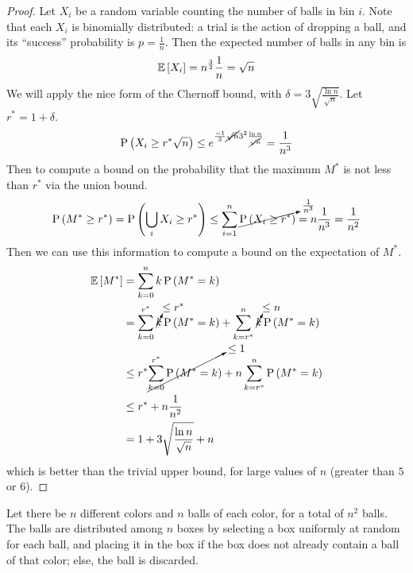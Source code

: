 \documentclass[11pt]{article}
\begin{document}
\begin{proof}
    Let $X_i$ be a random variable counting the number of balls in bin $i$.
    Note that each $X_i$ is binomially distributed:
    a trial is the action of dropping a ball, and its ``success'' probability
    is $p = \frac{1}{n}$.
    Then the expected number of balls in any bin is
    \begin{equation*}
        \E{X_i} = n^{\frac{3}{2}} \frac{1}{n} = \sqrt{n}
    \end{equation*}
    We will apply the nice form of the Chernoff bound, with
    $\delta = 3 \sqrt{\frac{\ln n}{\sqrt n}}$.
    Let $r^* = 1 + \delta$.
    \begin{equation*}
        \P{X_i \geq r^* \sqrt{n}}
        \leq e^{
            \frac{-1}{3} \cancel{\sqrt{n}} 3^2 \frac{\ln n}{\cancel{\sqrt n}}
        }
        = \frac{1}{n^3}
    \end{equation*}
    Then to compute a bound on the probability that the maximum $M^*$ is not
    less than $r^*$ via the union bound.
    \begin{equation*}
        \P{M^* \geq r^*}
        = \P{\Union_i X_i \geq r^*}
        \leq \sum_{i=1}^n \cancelto{\frac{1}{n^3}}{\P{X_i \geq r^*}}
        = n \frac{1}{n^3} = \frac{1}{n^2}
    \end{equation*}
    Then we can use this information to compute a bound on the expectation of
    $M^*$.
    \begin{align*}
        \E{M^*}
        &= \sum_{k=0}^n {k \P{M^* = k}} \\
        &= \sum_{k=0}^{r^*} {
            \cancelto{\leq r^*}{k} \P{M^* = k}
        }
        + \sum_{k=r^*}^{n} {
            \cancelto{\leq n}{k} \P{M^* = k}
        } \\
        &\leq
        r^* \cancelto{\leq 1}{
            \sum_{k=0}^{r^*} \P{M^* = k}
        }
        + n \sum_{k=r^*}^n { \P{M^* = k } } \\
        &\leq r^* + n \frac{1}{n^2} \\
        &= 1 + 3 \sqrt{\frac{\ln n}{\sqrt n}} + n
    \end{align*}
    which is better than the trivial upper bound, for large values of $n$
    (greater than $5$ or $6$).
\end{proof}


Let there be $n$ different colors and $n$ balls of each color, for a total of
$n^2$ balls. The balls are distributed among $n$ boxes by selecting a box
uniformly at random for each ball, and placing it in the box if the box does
not already contain a ball of that color; else, the ball is discarded.
\end{document}
